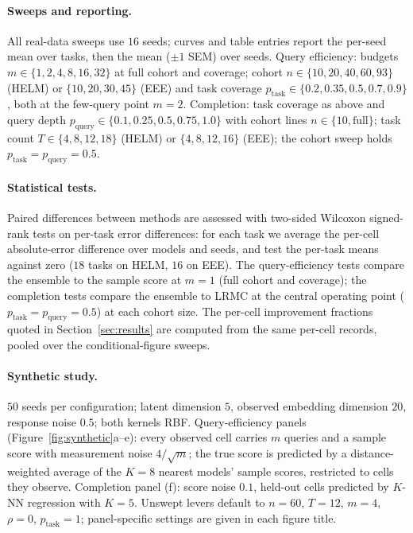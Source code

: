 \documentclass{article}
\theoremstyle{definition}
\theoremstyle{plain}
\begin{document}
\paragraph{Sweeps and reporting.}\begin{sloppypar} All real-data sweeps use $16$ seeds; curves and table
entries report the per-seed mean over tasks, then the mean ($\pm1$ SEM) over seeds. Query
efficiency: budgets $m\in\{1,2,4,8,16,32\}$ at full cohort and coverage; cohort
$n\in\{10,20,40,60,93\}$ (HELM) or $\{10,20,30,45\}$ (EEE) and task coverage
$p_{\mathrm{task}}\in\{0.2,0.35,0.5,0.7,0.9\}$, both at the few-query point $m{=}2$.
Completion: task coverage as above and query depth
$p_{\mathrm{query}}\in\{0.1,0.25,0.5,0.75,1.0\}$ with cohort lines $n\in\{10,\text{full}\}$;
task count $T\in\{4,8,12,18\}$ (HELM) or $\{4,8,12,16\}$ (EEE); the cohort sweep holds
$p_{\mathrm{task}}{=}p_{\mathrm{query}}{=}0.5$.\end{sloppypar}

\paragraph{Statistical tests.} Paired differences between methods are assessed with
two-sided Wilcoxon signed-rank tests on per-task error differences: for each task we
average the per-cell absolute-error difference over models and seeds, and test the
per-task means against zero ($18$ tasks on HELM, $16$ on EEE).
The query-efficiency tests compare the ensemble to the sample score at $m{=}1$ (full
cohort and coverage); the completion tests compare the ensemble to LRMC at the
central operating point ($p_{\mathrm{task}}{=}p_{\mathrm{query}}{=}0.5$) at each
cohort size.
The per-cell improvement fractions quoted in Section~\ref{sec:results} are computed
from the same per-cell records, pooled over the conditional-figure sweeps.

\paragraph{Synthetic study.} $50$ seeds per configuration; latent dimension $5$, observed
embedding dimension $20$, response noise $0.5$; both kernels RBF.
Query-efficiency panels (Figure~\ref{fig:synthetic}a--e): every observed cell carries
$m$ queries and a sample score with measurement noise $4/\sqrt{m}$; the true
score is predicted by a distance-weighted average of the $K{=}8$ nearest models'
sample scores, restricted to cells they observe.
Completion panel (f): score noise $0.1$, held-out cells predicted by $K$-NN regression
with $K{=}5$.
Unswept levers default to $n{=}60$, $T{=}12$, $m{=}4$, $\rho{=}0$,
$p_{\mathrm{task}}{=}1$; panel-specific settings are given in each figure title.
\end{document}
